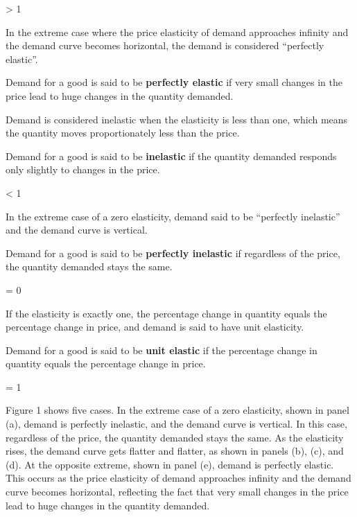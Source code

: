 \bse
{} > 1
\ese
\ed

In the extreme case where the price elasticity of demand approaches infinity and the demand curve becomes horizontal,
the demand is considered ``perfectly elastic''.

Demand for a good is said to be \textbf{perfectly elastic} if very small changes in the price lead to huge changes in
the quantity demanded.

\bse
{} \to \infty
\ese
\ed

Demand is considered inelastic when the elasticity is less than one, which means the quantity moves proportionately
less than the price.

Demand for a good is said to be \textbf{inelastic} if the quantity demanded responds only slightly to changes in the
price.

\bse
{} < 1
\ese
\ed

In the extreme case of a zero elasticity, demand said to be ``perfectly inelastic'' and the demand curve is vertical.

Demand for a good is said to be \textbf{perfectly inelastic} if regardless of the price, the quantity demanded stays
the same.

\bse
{} = 0
\ese
\ed

If the elasticity is exactly one, the percentage change in quantity equals the percentage change in price, and demand
is said to have unit elasticity.

Demand for a good is said to be \textbf{unit elastic} if the percentage change in quantity equals the percentage
change in price.

\bse
{} = 1
\ese
\ed

Figure 1 shows five cases. In the extreme case of a zero elasticity, shown in panel (a), demand is perfectly
inelastic, and the demand curve is vertical. In this case, regardless of the price, the quantity demanded stays the
same. As the elasticity rises, the demand curve gets flatter and flatter, as shown in panels (b), (c), and (d). At
the opposite extreme, shown in panel (e), demand is perfectly elastic. This occurs as the price elasticity of demand
approaches infinity and the demand curve becomes horizontal, reflecting the fact that very small changes in the price
lead to huge changes in the quantity demanded.

